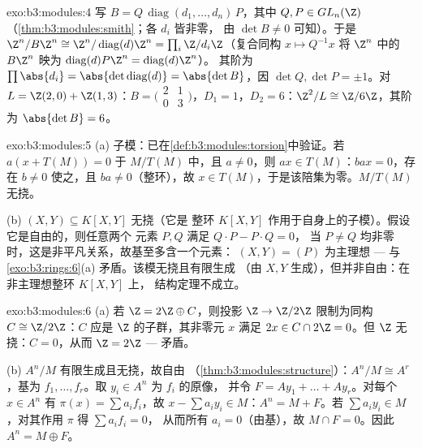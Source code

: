 \begin{solution}{exo:b3:modules:4}
写 $B = Q\,\operatorname{diag}(d_1, \dots, d_n)\,P$，其中 $Q, P
\in GL_n(\Z)$（\cref{thm:b3:modules:smith}；各 $d_i$ 皆非零，
由 $\det B \neq 0$ 可知）。于是 $\Z^n/B\Z^n \cong \Z^n/
\operatorname{diag}(d)\Z^n = \prod_i \Z/d_i\Z$（复合同构
$x \mapsto Q^{-1}x$ 将 $\Z^n$ 中的 $B\Z^n$ 映为
$\operatorname{diag}(d)P\Z^n = \operatorname{diag}(d)\Z^n$）。
其阶为 $\prod \abs{d_i} = \abs{\det
\operatorname{diag}(d)} = \abs{\det B}$，因 $\det Q, \det P = \pm
1$。对 $L = \Z(2,0) + \Z(1,3)$：$B = \bigl(\begin{smallmatrix}2
& 1\\ 0 & 3\end{smallmatrix}\bigr)$，$D_1 = 1$，$D_2 = 6$：$\Z^2/L
\cong \Z/6\Z$，其阶为 $\abs{\det B} = 6$。
\end{solution}

\begin{solution}{exo:b3:modules:5}
(a) 子模：已在\cref{def:b3:modules:torsion}中验证。若 $a(x +
T(M)) = 0$ 于 $M/T(M)$ 中，且 $a \neq 0$，则 $ax \in T(M)$：$bax
= 0$，存在 $b \neq 0$ 使之，且 $ba \neq 0$（整环），故 $x \in
T(M)$，于是该陪集为零。$M/T(M)$ 无挠。

(b) $(X, Y) \subseteq K[X,Y]$ 无挠（它是
整环 $K[X,Y]$ 作用于自身上的子模）。假设它是自由的，则任意两个
元素 $P, Q$ 满足 $Q\cdot P - P \cdot Q = 0$，
当 $P \ne Q$ 均非零时，这是非平凡关系，故基至多含一个元素：
$(X, Y) = (P)$ 为主理想 --- 与
\cref{exo:b3:rings:6}(a) 矛盾。该模无挠且有限生成
（由 $X, Y$ 生成），但并非自由：在非主理想整环 $K[X,Y]$ 上，
结构定理不成立。
\end{solution}

\begin{solution}{exo:b3:modules:6}
(a) 若 $\Z = 2\Z \oplus C$，则投影 $\Z \to \Z/2\Z$
限制为同构 $C \cong \Z/2\Z$：$C$ 应是
$\Z$ 的子群，其非零元 $x$ 满足 $2x \in C
\cap 2\Z = 0$。但 $\Z$ 无挠：$C = 0$，从而 $\Z =
2\Z$ --- 矛盾。

(b) $A^n/M$ 有限生成且无挠，故自由
（\cref{thm:b3:modules:structure}）：$A^n/M \cong A^r$，基为
$f_1, \dots, f_r$。取 $y_i \in A^n$ 为 $f_i$ 的原像，
并令 $F = Ay_1 + \dots + Ay_r$。对每个 $x \in A^n$ 有 $\pi(x)
= \sum a_if_i$，故 $x - \sum a_iy_i \in M$：$A^n = M + F$。若
$\sum a_iy_i \in M$，对其作用 $\pi$ 得 $\sum a_if_i = 0$，
从而所有 $a_i = 0$（由基），故 $M \cap F = 0$。因此 $A^n = M \oplus
F$。
\end{solution}

